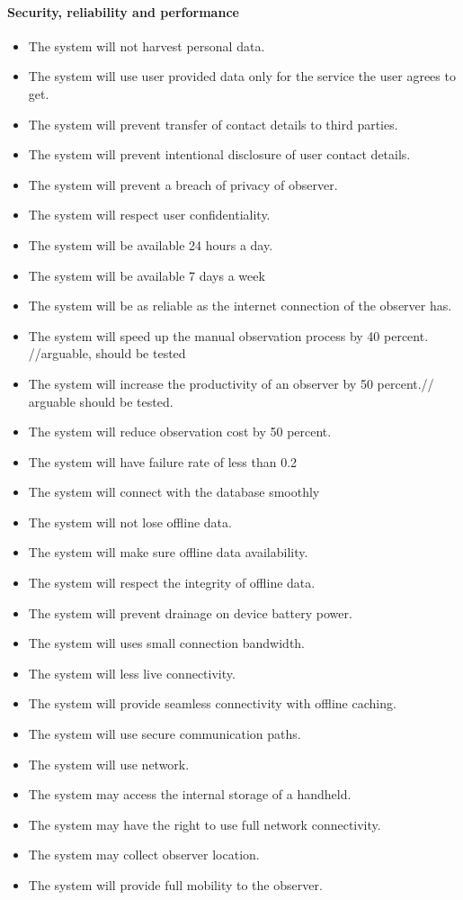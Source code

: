     \paragraph{Security, reliability and performance}
	\begin{itemize}
		\item The system will not harvest personal data.
        \item The system will use user provided data only for the service the user agrees to get.
        \item The system will prevent transfer of contact details to third parties.
        \item The system will prevent intentional disclosure of user contact details.
        \item The system will prevent a breach of privacy of observer.
        \item The system will respect user confidentiality.
        \item The system will be available 24 hours a day.
        \item The system will be available 7 days a week
        \item The system will be as reliable as the internet connection of the observer has.
        \item The system will speed up the manual observation process by 40 percent. //arguable, should be tested
        \item The system will increase the productivity of an observer by 50 percent.// arguable should be tested.
        \item The system will reduce observation cost by 50 percent.
        \item The system will have failure rate of less than 0.2 %
        \item The system will connect with the database smoothly
        \item The system will not lose offline data.
        \item The system will make sure offline data availability.
        \item The system will respect the integrity of offline data.
        \item The system will prevent drainage on device battery power.
        \item The system will uses small connection bandwidth.
        \item The system will less live connectivity.
        \item The system will provide seamless connectivity with offline caching.
        \item The system will use secure communication paths.
        \item The system will use network.
        \item The system may access the internal storage of a handheld.
        \item The system may have the right to use full network connectivity.
        \item The system may collect observer location.
        \item The system will provide full mobility to the observer.


\end{itemize}
